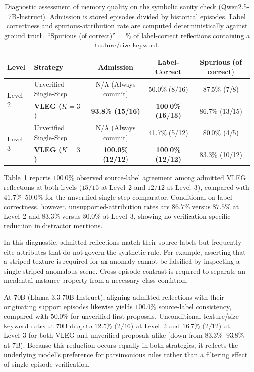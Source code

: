 \documentclass[10pt,a4paper,onecolumn]{article}
\theoremstyle{definition}
\theoremstyle{remark}
\begin{document}
\begin{table}[!t]
    \centering
    \caption{Diagnostic assessment of memory quality on the symbolic sanity check (Qwen2.5-7B-Instruct). Admission is stored episodes divided by historical episodes. Label correctness and spurious-attribution rate are computed deterministically against ground truth. ``Spurious (of correct)'' = \% of label-correct reflections containing a texture/size keyword.}
    \label{tab:exp5_memory_quality}
    \small
    \begin{tabular}{llccc}
        \toprule
        \textbf{Level} & \textbf{Strategy} & \textbf{Admission} & \textbf{Label-Correct} & \textbf{Spurious (of correct)} \\
        \midrule
        \multirow{2}{*}{Level 2} & Unverified Single-Step & N/A (Always commit) & 50.0\% (8/16) & 87.5\% (7/8) \\
                                 & \textbf{VLEG ($K{=}3$)} & \textbf{93.8\% (15/16)} & \textbf{100.0\% (15/15)} & 86.7\% (13/15) \\
        \midrule
        \multirow{2}{*}{Level 3} & Unverified Single-Step & N/A (Always commit) & 41.7\% (5/12) & 80.0\% (4/5) \\
                                 & \textbf{VLEG ($K{=}3$)} & \textbf{100.0\% (12/12)} & \textbf{100.0\% (12/12)} & 83.3\% (10/12) \\
        \bottomrule
    \end{tabular}
\end{table}

Table~\ref{tab:exp5_memory_quality} reports $100.0\%$ observed source-label agreement among admitted VLEG reflections at both levels ($15/15$ at Level~2 and $12/12$ at Level~3), compared with $41.7\%$--$50.0\%$ for the unverified single-step comparator. Conditional on label correctness, however, unsupported-attribution rates are $86.7\%$ versus $87.5\%$ at Level~2 and $83.3\%$ versus $80.0\%$ at Level~3, showing no verification-specific reduction in distractor mentions.

In this diagnostic, admitted reflections match their source labels but frequently cite attributes that do not govern the synthetic rule. For example, asserting that a striped texture is required for an anomaly cannot be falsified by inspecting a single striped anomalous scene. Cross-episode contrast is required to separate an incidental instance property from a necessary class condition.

At 70B (Llama-3.3-70B-Instruct), aligning admitted reflections with their originating support episodes likewise yields $100.0\%$ source-label consistency, compared with $50.0\%$ for unverified first proposals. Unconditional texture/size keyword rates at 70B drop to $12.5\%$ ($2/16$) at Level~2 and $16.7\%$ ($2/12$) at Level~3 for both VLEG and unverified proposals alike (down from $83.3\%$--$93.8\%$ at 7B). Because this reduction occurs equally in both strategies, it reflects the underlying model's preference for parsimonious rules rather than a filtering effect of single-episode verification.
\end{document}
